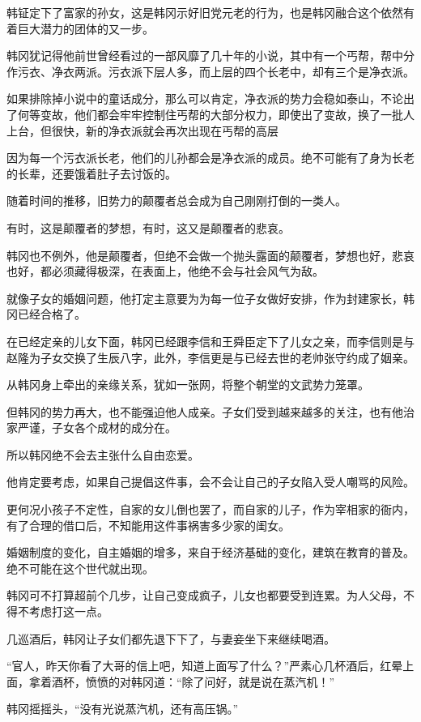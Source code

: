 韩钲定下了富家的孙女，这是韩冈示好旧党元老的行为，也是韩冈融合这个依然有着巨大潜力的团体的又一步。

韩冈犹记得他前世曾经看过的一部风靡了几十年的小说，其中有一个丐帮，帮中分作污衣、净衣两派。污衣派下层人多，而上层的四个长老中，却有三个是净衣派。

如果排除掉小说中的童话成分，那么可以肯定，净衣派的势力会稳如泰山，不论出了何等变故，他们都会牢牢控制住丐帮的大部分权力，即使出了变故，换了一批人上台，但很快，新的净衣派就会再次出现在丐帮的高层

因为每一个污衣派长老，他们的儿孙都会是净衣派的成员。绝不可能有了身为长老的长辈，还要饿着肚子去讨饭的。

随着时间的推移，旧势力的颠覆者总会成为自己刚刚打倒的一类人。

有时，这是颠覆者的梦想，有时，这又是颠覆者的悲哀。

韩冈也不例外，他是颠覆者，但绝不会做一个抛头露面的颠覆者，梦想也好，悲哀也好，都必须藏得极深，在表面上，他绝不会与社会风气为敌。

就像子女的婚姻问题，他打定主意要为为每一位子女做好安排，作为封建家长，韩冈已经合格了。

在已经定亲的儿女下面，韩冈已经跟李信和王舜臣定下了儿女之亲，而李信则是与赵隆为子女交换了生辰八字，此外，李信更是与已经去世的老帅张守约成了姻亲。

从韩冈身上牵出的亲缘关系，犹如一张网，将整个朝堂的文武势力笼罩。

但韩冈的势力再大，也不能强迫他人成亲。子女们受到越来越多的关注，也有他治家严谨，子女各个成材的成分在。

所以韩冈绝不会去主张什么自由恋爱。

他肯定要考虑，如果自己提倡这件事，会不会让自己的子女陷入受人嘲骂的风险。

更何况小孩子不定性，自家的女儿倒也罢了，而自家的儿子，作为宰相家的衙内，有了合理的借口后，不知能用这件事祸害多少家的闺女。

婚姻制度的变化，自主婚姻的增多，来自于经济基础的变化，建筑在教育的普及。绝不可能在这个世代就出现。

韩冈可不打算超前个几步，让自己变成疯子，儿女也都要受到连累。为人父母，不得不考虑打这一点。

几巡酒后，韩冈让子女们都先退下下了，与妻妾坐下来继续喝酒。

“官人，昨天你看了大哥的信上吧，知道上面写了什么？”严素心几杯酒后，红晕上面，拿着酒杯，愤愤的对韩冈道：“除了问好，就是说在蒸汽机！”

韩冈摇摇头，“没有光说蒸汽机，还有高压锅。”


